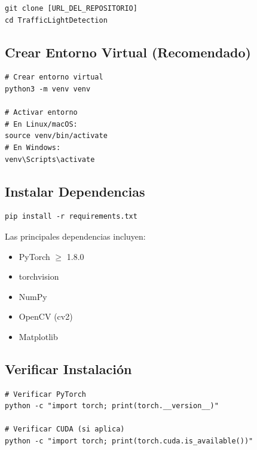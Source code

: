 \begin{codesnippet}
\begin{verbatim}
git clone [URL_DEL_REPOSITORIO]
cd TrafficLightDetection
\end{verbatim}
\end{codesnippet}

\subsection{Crear Entorno Virtual (Recomendado)}

\begin{codesnippet}
\begin{verbatim}
# Crear entorno virtual
python3 -m venv venv

# Activar entorno
# En Linux/macOS:
source venv/bin/activate
# En Windows:
venv\Scripts\activate
\end{verbatim}
\end{codesnippet}

\subsection{Instalar Dependencias}

\begin{codesnippet}
\begin{verbatim}
pip install -r requirements.txt
\end{verbatim}
\end{codesnippet}

Las principales dependencias incluyen:
\begin{itemize}
    \item PyTorch $\geq$ 1.8.0
    \item torchvision
    \item NumPy
    \item OpenCV (cv2)
    \item Matplotlib
\end{itemize}

\subsection{Verificar Instalación}

\begin{codesnippet}
\begin{verbatim}
# Verificar PyTorch
python -c "import torch; print(torch.__version__)"

# Verificar CUDA (si aplica)
python -c "import torch; print(torch.cuda.is_available())"
\end{verbatim}
\end{codesnippet}

